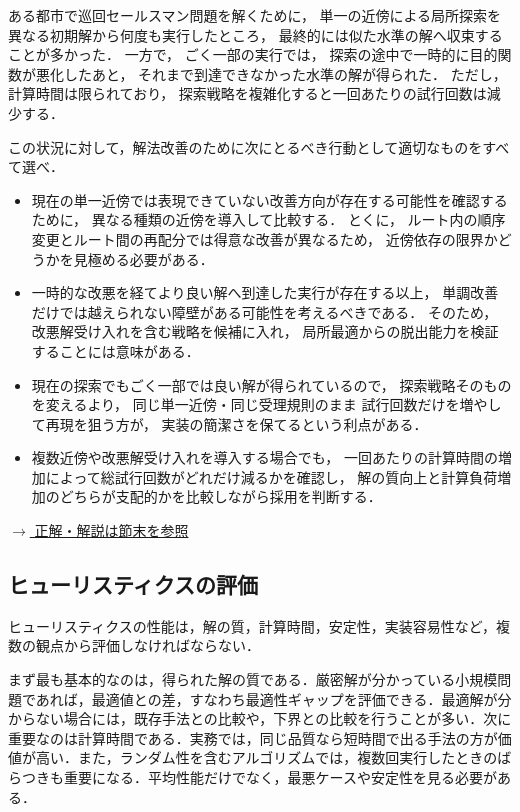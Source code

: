 \begin{example}[title={クイズ9：解法の設計3}]
ある都市で巡回セールスマン問題を解くために，
単一の近傍による局所探索を
異なる初期解から何度も実行したところ，
最終的には似た水準の解へ収束することが多かった．
一方で，
ごく一部の実行では，
探索の途中で一時的に目的関数が悪化したあと，
それまで到達できなかった水準の解が得られた．
ただし，計算時間は限られており，
探索戦略を複雑化すると一回あたりの試行回数は減少する．

この状況に対して，解法改善のために次にとるべき行動として適切なものをすべて選べ．

\begin{itemize}
\item[(ア)]
現在の単一近傍では表現できていない改善方向が存在する可能性を確認するために，
異なる種類の近傍を導入して比較する．
とくに，
ルート内の順序変更とルート間の再配分では得意な改善が異なるため，
近傍依存の限界かどうかを見極める必要がある．

\item[(イ)]
一時的な改悪を経てより良い解へ到達した実行が存在する以上，
単調改善だけでは越えられない障壁がある可能性を考えるべきである．
そのため，
改悪解受け入れを含む戦略を候補に入れ，
局所最適からの脱出能力を検証することには意味がある．

\item[(ウ)]
現在の探索でもごく一部では良い解が得られているので，
探索戦略そのものを変えるより，
同じ単一近傍・同じ受理規則のまま
試行回数だけを増やして再現を狙う方が，
実装の簡潔さを保てるという利点がある．

\item[(エ)]
複数近傍や改悪解受け入れを導入する場合でも，
一回あたりの計算時間の増加によって総試行回数がどれだけ減るかを確認し，
解の質向上と計算負荷増加のどちらが支配的かを比較しながら採用を判断する．
\end{itemize}

\hyperref[ans:heu-multi3-var]{$\rightarrow$ 正解・解説は節末を参照}
\end{example}

\subsection{ヒューリスティクスの評価}

ヒューリスティクスの性能は，解の質，計算時間，安定性，実装容易性など，複数の観点から評価しなければならない．

まず最も基本的なのは，得られた解の質である．厳密解が分かっている小規模問題であれば，最適値との差，すなわち最適性ギャップを評価できる．最適解が分からない場合には，既存手法との比較や，下界との比較を行うことが多い．次に重要なのは計算時間である．実務では，同じ品質なら短時間で出る手法の方が価値が高い．また，ランダム性を含むアルゴリズムでは，複数回実行したときのばらつきも重要になる．平均性能だけでなく，最悪ケースや安定性を見る必要がある．

